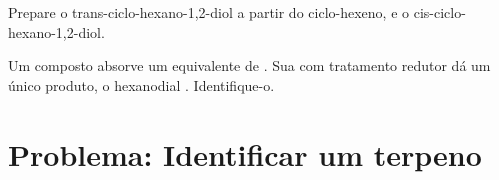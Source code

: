 \begin{exercise}[$\star\star\star$]\label{exo:b2:alkene-redox:11}
Prepare o trans-ciclo-hexano-1,2-diol a partir do ciclo-hexeno, e o cis-ciclo-hexano-1,2-diol.
\end{exercise}

\begin{exercise}[$\star\star\star$]\label{exo:b2:alkene-redox:12}
Um composto  absorve um equivalente de . Sua  com
tratamento redutor dá um único produto, o hexanodial .
Identifique-o.
\end{exercise}

\section{Problema: Identificar um terpeno}

